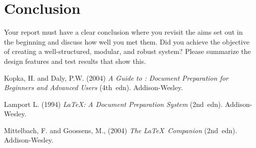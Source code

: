 \documentclass[11pt,a4paper]{article}
\begin{document}
\section{Conclusion}
\label{ss:conclusion}

Your report must have a clear conclusion where you revisit the aims
set out in the beginning and discuss how well you met them. Did you
achieve the objective of creating a well-structured, modular, and
robust system?  Please summarize the design features and test results
that show this.

\begin{thebibliography}{9}

Kopka, H. and Daly, P.W.  (2004) \textit{A Guide to \LaTeXe:
Document Preparation for Beginners and Advanced Users} (4th~edn).
Addison-Wesley.

Lamport L. (1994) \textit{\LaTeX: A Document Preparation System}
(2nd~edn). Addison-Wesley.

Mittelbach, F. and Goossens, M., (2004) \textit{The \LaTeX\
Companion} (2nd~edn). Addison-Wesley.

\end{thebibliography}
\end{document}

